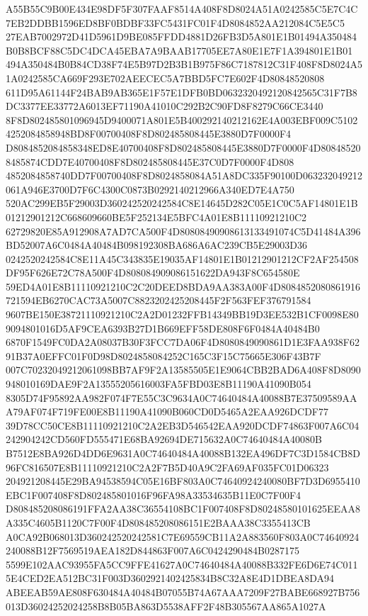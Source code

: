 \documentclass[UTF8,fontset=fandol,zihao=-4,a4paper]{ctexart}
\begin{document}
{{A55B55C9B00E434E98DF5F307FAAF8514A408F8D8024A51A0242585C5E7C4C7EB2DDBB1596ED8BF0BDBF33FC5431FC01F4D8084852AA212084C5E5C5
27EAB7002972D41D5961D9BE085FFDD4881D26FB3D5A801E1B01494A350484B0B8BCF88C5DC4DCA45EBA7A9BAAB17705EE7A80E1E7F1A394801E1B01
494A350484B0B84CD38F74E5B97D2B3B1B975F86C7187812C31F408F8D8024A51A0242585CA669F293E702AEECEC5A7BBD5FC7E602F4D80848520808
611D95A61144F24BAB9AB365E1F57E1DFB0BD0632320492120842565C31F7B8DC3377EE33772A6013EF71190A41010C292B2C90FD8F8279C66CE3440
8F8D802485801096945D9400071A801E5B400292140212162E4A003EBF009C51024252084858948BD8F00700408F8D802485808445E3880D7F0000F4
D8084852084858348ED8E40700408F8D802485808445E3880D7F0000F4D808485208485874CDD7E40700408F8D802485808445E37C0D7F0000F4D808
4852084858740DD7F00700408F8D8024858084A51A8DC335F90100D063232049212061A946E3700D7F6C4300C0873B0292140212966A340ED7E4A750
520AC299EB5F29003D360242520242584C8E14645D282C05E1C0C5AF14801E1B01212901212C668609660BE5F252134E5BFC4A01E8B11110921210C2
62729820E85A912908A7AD7CA500F4D80808490908613133491074C5D41484A396BD52007A6C0484A40484B098192308BA686A6AC239CB5E29003D36
0242520242584C8E11A45C343835E19035AF14801E1B01212901212CF2AF254508DF95F626E72C78A500F4D808084909086151622DA943F8C654580E
59ED4A01E8B11110921210C2C20DEED8BDA9AA383A00F4D8084852080861916721594EB6270CAC73A5007C8823202425208445F2F563FEF376791584
9607BE150E38721110921210C2A2D01232FFB14349BB19D3EE532B1CF0098E809094801016D5AF9CEA6393B27D1B669EFF58DE808F6F0484A40484B0
6870F1549FC0DA2A08037B30F3FCC7DA06F4D8080849090861D1E3FAA938F6291B37A0EFFC01F0D98D8024858084252C165C3F15C75665E306F43B7F
007C70232049212061098BB7AF9F2A13585505E1E9064CBB2BAD6A408F8D8090948010169DAE9F2A13555205616003FA5FBD03E8B11190A41090B054
8305D74F95892AA982F074F7E55C3C9634A0C74640484A40088B7E37509589AAA79AF074F719FE00E8B11190A41090B060CD0D5465A2EAA926DCDF77
39D78CC50CE8B11110921210C2A2EB3D546542EAA920DCDF74863F007A6C04242904242CD560FD555471E68BA92694DE715632A0C74640484A40080B
B7512E8BA926D4DD6E9631A0C74640484A40088B132EA496DF7C3D1584CB8D96FC816507E8B11110921210C2A2F7B5D40A9C2FA69AF035FC01D06323
204921208445E29BA94538594C05E16BF803A0C74640924240080BF7D3D6955410EBC1F007408F8D802485801016F96FA98A33534635B11E0C7F00F4
D808485208086191FFA2AA38C36554108BC1F007408F8D80248580101625EEAA8A335C4605B1120C7F00F4D808485208086151E2BAAA38C3355413CB
A0CA92B068013D360242520242581C7E69559CB11A2A883560F803A0C74640924240088B12F7569519AEA182D844863F007A6C0424290484B0287175
5599E102AAC93955FA5CC9FFE41627A0C74640484A40088B332FE6D6E74C0115E4CED2EA512BC31F003D3602921402425834B8C32A8E4D1DBEA8DA94
ABEEAB59AE808F630484A40484B07055B74A67AAA7209F27BABE668927B756013D36024252024258B8B05BA863D5538AFF2F48B305567AA865A1027A
}}
\end{document}
